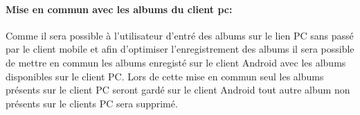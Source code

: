 \paragraph{Mise en commun avec les albums du client pc:} 
Comme il sera possible à l'utilisateur d'entré des albums sur le lien PC sans passé par le client mobile et afin d'optimiser l'enregistrement des albums il sera possible de mettre en commun les albums enregisté sur le client Android avec les albums disponibles sur le client PC.
Lors de cette mise en commun seul les albums présents sur le client PC seront gardé sur le client Android tout autre album non présents sur le clients PC sera supprimé.  

